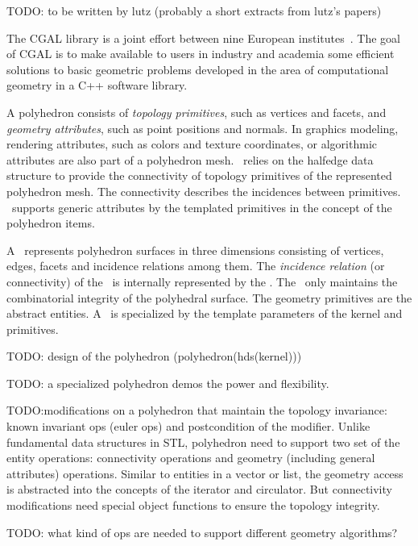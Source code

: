 TODO: to be written by lutz (probably a short extracts from lutz's papers)

The CGAL library is a joint effort between nine European
institutes~\cite{fgkss-dccga-00}. The goal of CGAL is to make
available to users in industry and academia some efficient solutions
to basic geometric problems developed in the area of computational
geometry in a C++ software library.

A polyhedron consists of \emph{topology primitives}, 
such as vertices and facets, and \emph{geometry attributes}, 
such as point positions and normals. 
In graphics modeling, rendering attributes, 
such as colors and texture coordinates, or algorithmic 
attributes are also part of a polyhedron mesh.
\cgalpoly\ relies on the halfedge data 
structure \cite{hds} to provide the connectivity of 
topology primitives of the represented polyhedron mesh. 
The connectivity describes the incidences between 
primitives. \poly\ supports generic attributes 
by the templated primitives in the concept of the polyhedron
items.

A \cgalpoly\ represents polyhedron surfaces in three dimensions
consisting of vertices, edges, facets and incidence relations among them.
The \emph{incidence relation} (or connectivity) of the \poly\ is
internally represented by the \cgalhds . 
The \poly\ only maintains the combinatorial integrity of the 
polyhedral surface. The geometry primitives are the abstract 
entities. A \poly\ is specialized by the
template parameters of the kernel and primitives.

TODO: design of the polyhedron (polyhedron(hds(kernel)))

TODO: a specialized polyhedron demos the power and flexibility.

TODO:modifications on a polyhedron that maintain the topology invariance:
known invariant ops (euler ops) and postcondition of the modifier. Unlike
fundamental data structures in STL, polyhedron need to support two
set of the entity operations: connectivity operations and geometry 
(including general attributes) operations. Similar to 
entities in a vector or list, the geometry access is
abstracted into the concepts of the iterator and circulator.
But connectivity modifications need special object functions
to ensure the topology integrity.

TODO: what kind of ops are needed to support different geometry algorithms?

